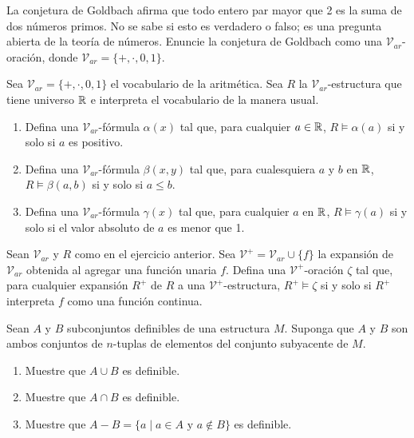 \documentclass[12pt,a4paper]{book}
\newcommand{\VV}{\mathcal{V}}
\begin{document}
    \begin{ejercicio}
        La conjetura de Goldbach afirma que todo entero par mayor que 2 es la suma de dos números primos. No se sabe si
        esto es verdadero o falso; es una pregunta abierta de la teoría de números. Enuncie la conjetura de Goldbach como
        una $\VV_{ar}$-oración, donde $\VV_{ar}=\{+,\cdot,0,1\}$.
    \end{ejercicio}

    \begin{ejercicio}
        Sea $\VV_{ar}=\{+,\cdot,0,1\}$ el vocabulario de la aritmética. Sea $R$ la $\VV_{ar}$-estructura que tiene
        universo $\mathbb{R}$ e interpreta el vocabulario de la manera usual.
        \begin{enumerate}[label=(\alph*)]
            \item Defina una $\VV_{ar}$-fórmula $\alpha(x)$ tal que, para cualquier $a\in\mathbb{R}$, $R\models\alpha(a)$ si y solo
            si $a$ es positivo.
            \item Defina una $\VV_{ar}$-fórmula $\beta(x,y)$ tal que, para cualesquiera $a$ y $b$ en $\mathbb{R}$, $R\models\beta(a,b)$
            si y solo si $a\leq b$.
            \item Defina una $\VV_{ar}$-fórmula $\gamma(x)$ tal que, para cualquier $a$ en $\mathbb{R}$, $R\models\gamma(a)$ si y
            solo si el valor absoluto de $a$ es menor que 1.
        \end{enumerate}
    \end{ejercicio}

    \begin{ejercicio}
        Sean $\VV_{ar}$ y $R$ como en el ejercicio anterior. Sea $\VV^{+}=\VV_{ar}\cup\{f\}$ la expansión de $\VV_{ar}$
        obtenida al agregar una función unaria $f$. Defina una $\VV^{+}$-oración $\zeta$ tal que, para cualquier
        expansión $R^{+}$ de $R$ a una $\VV^{+}$-estructura, $R^{+}\models\zeta$ si y solo si $R^{+}$ interpreta $f$ como
        una función continua.
    \end{ejercicio}

    \begin{ejercicio}
        Sean $A$ y $B$ subconjuntos definibles de una estructura $M$. Suponga que $A$ y $B$ son ambos conjuntos de
        $n$-tuplas de elementos del conjunto subyacente de $M$.
        \begin{enumerate}[label=(\alph*)]
            \item Muestre que $A\cup B$ es definible.
            \item Muestre que $A\cap B$ es definible.
            \item Muestre que $A-B=\{a\mid a\in A\text{ y }a\notin B\}$ es definible.
        \end{enumerate}
    \end{ejercicio}
\end{document}
